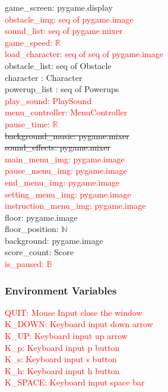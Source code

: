 \documentclass[12pt]{article}
\begin{document}
game\_screen: pygame.display\\
\textcolor{red}{obstacle\_img: seq of pygame.image}\\
\textcolor{red}{sound\_list: seq of pygame.mixer}\\
\textcolor{red}{game\_speed: $\mathbb{R}$}\\
\textcolor{red}{load\_character: seq of seq of pygame.image}\\
obstacle\_list: seq of Obstacle\\
character : Character \\
powerup\_list : seq of Powerups\\
\textcolor{red}{play\_sound: PlaySound}\\
\textcolor{red}{menu\_controller: MenuController}\\
\textcolor{red}{pause\_time: $\mathbb{R}$}\\
\sout{background\_music: pygame.mixer}\\
\sout{sound\_effects: pygame.mixer\\}
\textcolor{red}{main\_menu\_img: pygame.image}\\
\textcolor{red}{pause\_menu\_img: pygame.image}\\
\textcolor{red}{end\_menu\_img: pygame.image}\\
\textcolor{red}{setting\_menu\_img: pygame.image}\\
\textcolor{red}{instruction\_menu\_img: pygame.image}\\
floor: pygame.image\\
floor\_position: $\mathbb{N}$\\
background: pygame.image\\
score\_count: Score\\
\textcolor{red}{is\_paused: $\mathbb{B}$}\\

\subsubsection* {Environment Variables}
\textcolor{red}{QUIT: Mouse Input close the window  }\\
\textcolor{red}{K\_DOWN: Keyboard input down arrow}\\
\textcolor{red}{K\_UP: Keyboard input up arrow}\\
\textcolor{red}{K\_p: Keyboard input p button}\\
\textcolor{red}{K\_s: Keyboard input s button}\\
\textcolor{red}{K\_h: Keyboard input h button}\\
\textcolor{red}{K\_SPACE: Keyboard input space bar}\\
\end{document}
